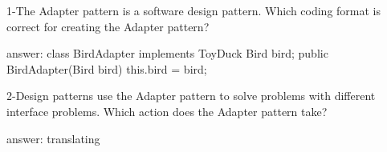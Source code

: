 1-The Adapter pattern is a software design pattern. Which coding format is correct for creating the Adapter pattern?

answer: 
class BirdAdapter implements ToyDuck 
{ 
    Bird bird; 
    public BirdAdapter(Bird bird) 
    { 
         this.bird = bird; 
    } 
}

2-Design patterns use the Adapter pattern to solve problems with different interface problems. Which action does the Adapter pattern take?


answer: translating 